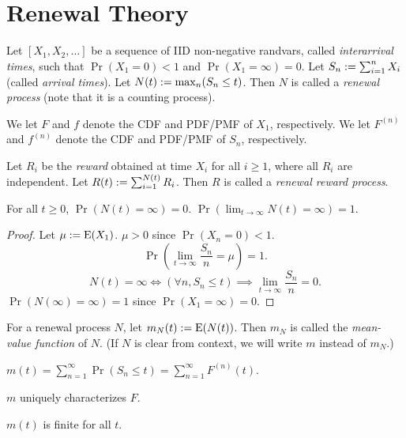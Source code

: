 \documentclass[a4paper, 12pt, fleqn]{article}
\begin{document}
\section{Renewal Theory}

\begin{definition}
Let $[X_1, X_2, \ldots]$ be a sequence of IID non-negative randvars, called \emph{interarrival times},
such that $\Pr(X_1 = 0) < 1$ and $\Pr(X_1 = \infty) = 0$.
Let $S_n := \sum_{i=1}^n X_i$ (called \emph{arrival times}). Let $N(t) := \max_n (S_n \le t)$.
Then $N$ is called a \emph{renewal process} (note that it is a counting process).

We let $F$ and $f$ denote the CDF and PDF/PMF of $X_1$, respectively.
We let $F^{(n)}$ and $f^{(n)}$ denote the CDF and PDF/PMF of $S_n$, respectively.

Let $R_i$ be the \emph{reward} obtained at time $X_i$ for all $i \ge 1$,
where all $R_i$ are independent. Let $R(t) := \sum_{i=1}^{N(t)} R_i$.
Then $R$ is called a \emph{renewal reward process}.
\end{definition}

\begin{lemma}
For all $t \ge 0$, $\Pr(N(t) = \infty) = 0$. $\Pr(\lim_{t \to \infty} N(t) = \infty) = 1$.
\end{lemma}
\begin{proof}
Let $\mu := \operatorname*{E}(X_1)$. $\mu > 0$ since $\Pr(X_n = 0) < 1$.
\[ \Pr\left(\lim_{t \to \infty} \frac{S_n}{n} = \mu\right) = 1.  \tag{strong law of large numbers} \]
\[ N(t) = \infty \iff (\forall n, S_n \le t) \implies \lim_{t \to \infty} \frac{S_n}{n} = 0. \]
$\Pr(N(\infty) = \infty) = 1$ since $\Pr(X_1 = \infty) = 0$.
\end{proof}

\begin{definition}
For a renewal process $N$, let $m_N(t) := \operatorname*{E}(N(t))$.
Then $m_N$ is called the \emph{mean-value function} of $N$.
(If $N$ is clear from context, we will write $m$ instead of $m_N$.)
\end{definition}

\begin{lemma}
$m(t) = \sum_{n=1}^{\infty} \Pr(S_n \le t) = \sum_{n=1}^{\infty} F^{(n)}(t)$.
\end{lemma}

\begin{theorem}
$m$ uniquely characterizes $F$.
\end{theorem}

\begin{lemma}
$m(t)$ is finite for all $t$.
\end{lemma}
\end{document}
